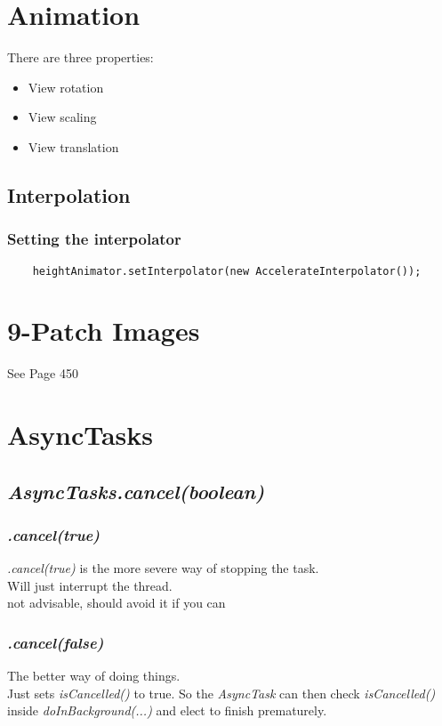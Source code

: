 \documentclass[]{article}
\renewcommand{\it}[1]{\textit{#1}}
\begin{document}
\section{Animation}
There are three properties:
\begin{itemize}
	\item View rotation
	\item View scaling
	\item View translation
\end{itemize}

\subsection{Interpolation}
\subsubsection{Setting the interpolator}
\begin{lstlisting}
	heightAnimator.setInterpolator(new AccelerateInterpolator());
\end{lstlisting}

\section{9-Patch Images}
See Page 450 

\section{AsyncTasks}
\subsection{\it{AsyncTasks.cancel(boolean)}}
\subsubsection{\it{.cancel(true)}}
\textit{.cancel(true)} is the more severe way of stopping the task.
\\
Will just interrupt the thread.
\\
not advisable, should avoid it if you can
\subsubsection{\it{.cancel(false)}}
The better way of doing things.
\\
Just sets \textit{isCancelled()} to true.  So the \textit{AsyncTask} can then check \textit{isCancelled()} inside \textit{doInBackground(...)} and elect to finish prematurely.
\end{document}
